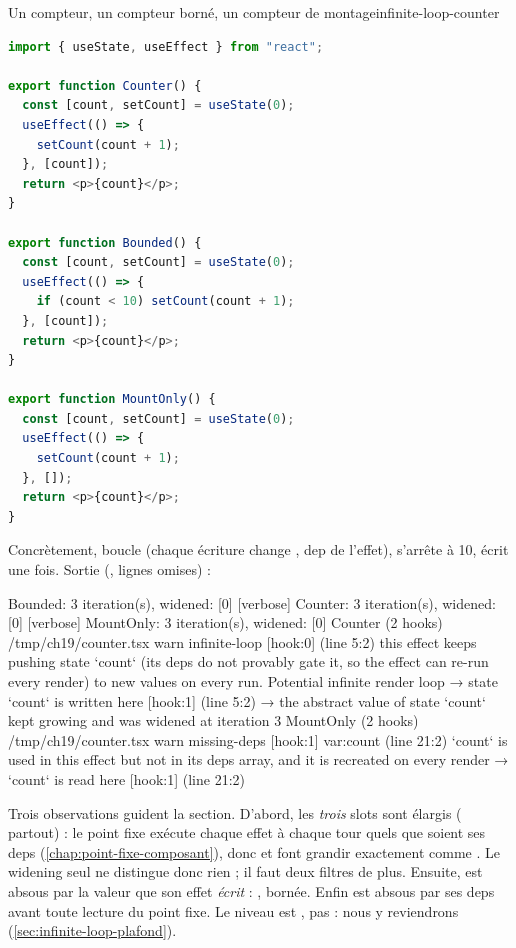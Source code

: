 \begin{exemple}{Un compteur, un compteur borné, un compteur de montage}{infinite-loop-counter}
\begin{lstlisting}[language=TypeScript,caption={\file{/tmp/ch19/counter.tsx}},label={lst:infinite-loop-counter}]
import { useState, useEffect } from "react";

export function Counter() {
  const [count, setCount] = useState(0);
  useEffect(() => {
    setCount(count + 1);
  }, [count]);
  return <p>{count}</p>;
}

export function Bounded() {
  const [count, setCount] = useState(0);
  useEffect(() => {
    if (count < 10) setCount(count + 1);
  }, [count]);
  return <p>{count}</p>;
}

export function MountOnly() {
  const [count, setCount] = useState(0);
  useEffect(() => {
    setCount(count + 1);
  }, []);
  return <p>{count}</p>;
}
\end{lstlisting}
Concrètement,  boucle (chaque écriture change , dep de l'effet),  s'arrête à 10,  écrit une fois. Sortie (, lignes  omises) :
\begin{sortie}
  [verbose] Bounded: 3 iteration(s), widened: [0]
  [verbose] Counter: 3 iteration(s), widened: [0]
  [verbose] MountOnly: 3 iteration(s), widened: [0]
  Counter  (2 hooks)  /tmp/ch19/counter.tsx
    warn   infinite-loop  [hook:0]  (line 5:2)  this effect keeps pushing state `count` (its deps do not provably gate it, so the effect can re-run every render) to new values on every run. Potential infinite render loop
       → state `count` is written here [hook:1] (line 5:2)
       → the abstract value of state `count` kept growing and was widened at iteration 3
  MountOnly  (2 hooks)  /tmp/ch19/counter.tsx
    warn   missing-deps  [hook:1]  var:count  (line 21:2)  `count` is used in this effect but not in its deps array, and it is recreated on every render
       → `count` is read here [hook:1] (line 21:2)
\end{sortie}
\end{exemple}

Trois observations guident la section. D'abord, les \emph{trois} slots sont élargis ( partout) : le point fixe exécute chaque effet à chaque tour quels que soient ses deps (\cref{chap:point-fixe-composant}), donc  et  font grandir  exactement comme . Le widening seul ne distingue donc rien ; il faut deux filtres de plus. Ensuite,  est absous par la valeur que son effet \emph{écrit} : \code{[1,10]}, bornée. Enfin  est absous par ses deps avant toute lecture du point fixe. Le niveau est \Warning, pas \Error{} : nous y reviendrons (\cref{sec:infinite-loop-plafond}).

